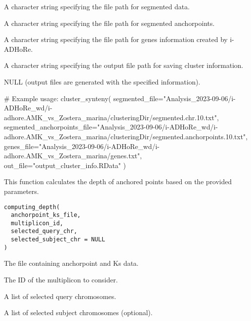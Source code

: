 \documentclass[a4paper]{book}
\begin{document}
%
\begin{Arguments}
\begin{ldescription}
\item[\code{segmented\_file}] A character string specifying the file path for segmented data.

\item[\code{segmented\_anchorpoints\_file}] A character string specifying the file path for segmented anchorpoints.

\item[\code{genes\_file}] A character string specifying the file path for genes information created by i-ADHoRe.

\item[\code{out\_file}] A character string specifying the output file path for saving cluster information.
\end{ldescription}
\end{Arguments}
%
\begin{Value}
NULL (output files are generated with the specified information).
\end{Value}
%
\begin{Examples}
\begin{ExampleCode}
# Example usage:
cluster_synteny(
    segmented_file="Analysis_2023-09-06/i-ADHoRe_wd/i-adhore.AMK_vs_Zostera_marina/clusteringDir/segmented.chr.10.txt",
    segmented_anchorpoints_file="Analysis_2023-09-06/i-ADHoRe_wd/i-adhore.AMK_vs_Zostera_marina/clusteringDir/segmented.anchorpoints.10.txt",
    genes_file="Analysis_2023-09-06/i-ADHoRe_wd/i-adhore.AMK_vs_Zostera_marina/genes.txt",
    out_file="output_cluster_info.RData"
)
\end{ExampleCode}
\end{Examples}
%
\begin{Description}\relax
This function calculates the depth of anchored points based on the provided parameters.
\end{Description}
%
\begin{Usage}
\begin{verbatim}
computing_depth(
  anchorpoint_ks_file,
  multiplicon_id,
  selected_query_chr,
  selected_subject_chr = NULL
)
\end{verbatim}
\end{Usage}
%
\begin{Arguments}
\begin{ldescription}
\item[\code{anchorpoint\_ks\_file}] The file containing anchorpoint and Ks data.

\item[\code{multiplicon\_id}] The ID of the multiplicon to consider.

\item[\code{selected\_query\_chr}] A list of selected query chromosomes.

\item[\code{selected\_subject\_chr}] A list of selected subject chromosomes (optional).
\end{ldescription}
\end{Arguments}
\end{document}

